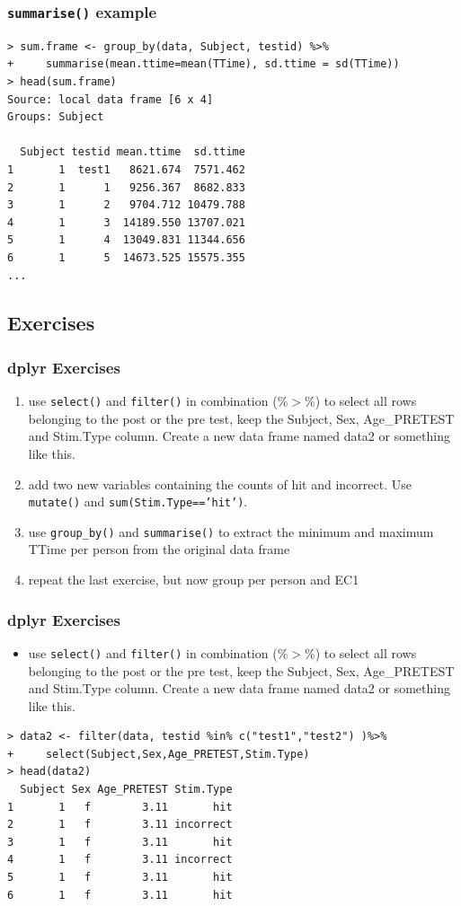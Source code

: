 \documentclass[xcolor={table},c]{beamer}
\begin{document}
\begin{frame}[fragile]\frametitle{\texttt{summarise()} example}
\footnotesize
\begin{verbatim}
> sum.frame <- group_by(data, Subject, testid) %>%
+     summarise(mean.ttime=mean(TTime), sd.ttime = sd(TTime))
> head(sum.frame)
Source: local data frame [6 x 4]
Groups: Subject

  Subject testid mean.ttime  sd.ttime
1       1  test1   8621.674  7571.462
2       1      1   9256.367  8682.833
3       1      2   9704.712 10479.788
4       1      3  14189.550 13707.021
5       1      4  13049.831 11344.656
6       1      5  14673.525 15575.355
...
\end{verbatim}
\end{frame}

\subsection{Exercises}
\begin{frame}[fragile]\frametitle{dplyr Exercises}
  \begin{enumerate}
  \item use \texttt{select()} and \texttt{filter()} in combination ($\%>\%$) to select all rows belonging to the post or the pre test, keep the Subject, Sex, Age\_PRETEST and Stim.Type column. Create a new data frame named data2 or something like this.
  \item add two new variables containing the counts of hit and incorrect. Use \texttt{mutate()} and \texttt{sum(Stim.Type=='hit')}.
  \item use \texttt{group\_by()} and \texttt{summarise()} to extract the minimum and maximum TTime per person from the original data frame
  \item repeat the last exercise, but now group per person and EC1
  \end{enumerate}
\end{frame}


\begin{frame}[fragile]\frametitle{dplyr Exercises}
  \begin{itemize}
  \item use \texttt{select()} and \texttt{filter()} in combination ($\%>\%$) to select all rows belonging to the post or the pre test, keep the Subject, Sex, Age\_PRETEST and Stim.Type column. Create a new data frame named data2 or something like this.
  \end{itemize}\small
\begin{verbatim}
> data2 <- filter(data, testid %in% c("test1","test2") )%>%
+     select(Subject,Sex,Age_PRETEST,Stim.Type)
> head(data2)
  Subject Sex Age_PRETEST Stim.Type
1       1   f        3.11       hit
2       1   f        3.11 incorrect
3       1   f        3.11       hit
4       1   f        3.11 incorrect
5       1   f        3.11       hit
6       1   f        3.11       hit
\end{verbatim}
\end{frame}
\end{document}
